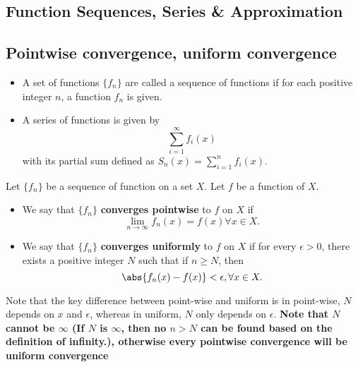 
\begin{refsection}
	
\startcontents[chapters]	
\chapter{Function Sequences, Series \& Approximation}\label{ch:function-sequences-series--approximation}

\section{Pointwise convergence, uniform convergence}
\begin{definition}\hfill
	\begin{itemize}
		\item A set of functions $\{f_n\}$ are called a sequence of functions if for each positive integer $n$, a function $f_n$ is given. 
		\item A series of functions is given by
		$$\sum_{i=1}^\infty f_i(x)$$ with its partial sum defined as $S_n(x) = \sum_{i=1}^n f_i(x)$.
	\end{itemize}	
	
\end{definition}

\begin{definition}\cite{johnsonbaugh2010foundations}
	Let $\{f_n\}$ be a sequence of function on a set $X$. Let $f$ be a function of $X$.
	\begin{itemize}
		\item  We say that $\{f_n\}$ \textbf{converges pointwise} to $f$ on $X$ if  
		$$\lim_{n\rightarrow \infty} f_n(x) = f(x) \forall x\in X.$$
		\item We say that $\{f_n\}$ \textbf{converges uniformly} to $f$ on $X$ if for every $\epsilon > 0$, there exists a positive integer $N$ such that if $n \geq N$, then
		$$\abs{f_n(x)-f(x)} < \epsilon, \forall x\in X.$$
	\end{itemize}
\end{definition}
\begin{remark}
	Note that the key difference between point-wise and uniform is in point-wise, $N$ depends on $x$ and $\epsilon$, whereas in uniform, $N$ only depends on $\epsilon$. \textbf{Note that $N$ cannot be $\infty$ (If $N$ is $\infty$, then no $n>N$ can be found based on the definition of infinity.), otherwise every pointwise convergence will be uniform convergence}
\end{remark}


\end{refsection}
